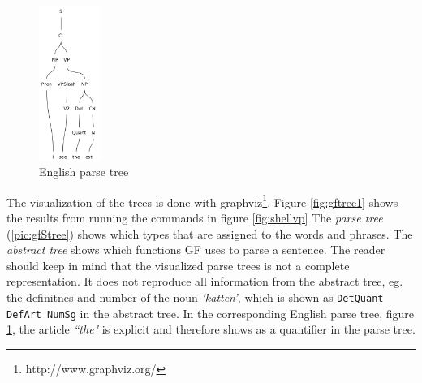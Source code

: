 \documentclass{report}
\begin{document}
\begin{figure}
\includegraphics[width=20mm]{gfETree.png}
\caption{English parse tree}
\label{pic:gfEtree}
\end{figure}
The visualization of the trees is done with graphviz\footnote{http://www.graphviz.org/}.
Figure \ref{fig:gftree1} shows the results from running the commands in figure \ref{fig:shellvp}
The \textit{parse tree} (\ref{pic:gfStree}) shows which types
that are assigned to the words and phrases. 
The \textit{abstract tree} shows which functions GF uses
to parse a sentence.
The reader should keep in mind that the visualized parse trees is not a
complete representation. It does not reproduce all information from the abstract tree,
eg. the definitnes and number of the noun \emph{`katten'}, which is shown as
\verb-DetQuant DefArt NumSg- in the abstract tree.
In the corresponding English parse tree, figure \ref{pic:gfEtree},
the article \emph{``the"} is explicit and therefore shows as a quantifier in the parse tree.\\

\end{document}
